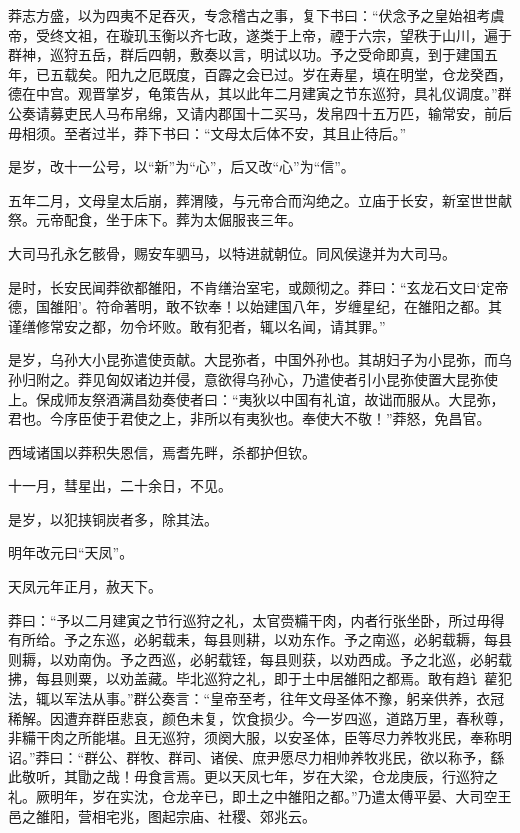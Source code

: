 \documentclass[]{article}
\begin{document}
莽志方盛，以为四夷不足吞灭，专念稽古之事，复下书曰：``伏念予之皇始祖考虞帝，受终文祖，在璇玑玉衡以齐七政，遂类于上帝，禋于六宗，望秩于山川，遍于群神，巡狩五岳，群后四朝，敷奏以言，明试以功。予之受命即真，到于建国五年，已五载矣。阳九之厄既度，百霹之会已过。岁在寿星，填在明堂，仓龙癸酉，德在中宫。观晋掌岁，龟策告从，其以此年二月建寅之节东巡狩，具礼仪调度。''群公奏请募吏民人马布帛绵，又请内郡国十二买马，发帛四十五万匹，输常安，前后毋相须。至者过半，莽下书曰：``文母太后体不安，其且止待后。''

是岁，改十一公号，以``新''为``心''，后又改``心''为``信''。

五年二月，文母皇太后崩，葬渭陵，与元帝合而沟绝之。立庙于长安，新室世世献祭。元帝配食，坐于床下。葬为太倔服丧三年。

大司马孔永乞骸骨，赐安车驷马，以特进就朝位。同风侯逯并为大司马。

是时，长安民闻莽欲都雒阳，不肯缮治室宅，或颇彻之。莽曰：``玄龙石文曰`定帝德，国雒阳'。符命著明，敢不钦奉！以始建国八年，岁缠星纪，在雒阳之都。其谨缮修常安之都，勿令坏败。敢有犯者，辄以名闻，请其罪。''

是岁，乌孙大小昆弥遣使贡献。大昆弥者，中国外孙也。其胡妇子为小昆弥，而乌孙归附之。莽见匈奴诸边并侵，意欲得乌孙心，乃遣使者引小昆弥使置大昆弥使上。保成师友祭酒满昌劾奏使者曰：``夷狄以中国有礼谊，故诎而服从。大昆弥，君也。今序臣使于君使之上，非所以有夷狄也。奉使大不敬！''莽怒，免昌官。

西域诸国以莽积失恩信，焉耆先畔，杀都护但钦。

十一月，彗星出，二十余日，不见。

是岁，以犯挟铜炭者多，除其法。

明年改元曰``天凤''。

天凤元年正月，赦天下。

莽曰：``予以二月建寅之节行巡狩之礼，太官赍糒干肉，内者行张坐卧，所过毋得有所给。予之东巡，必躬载耒，每县则耕，以劝东作。予之南巡，必躬载耨，每县则耨，以劝南伪。予之西巡，必躬载铚，每县则获，以劝西成。予之北巡，必躬载拂，每县则粟，以劝盖藏。毕北巡狩之礼，即于土中居雒阳之都焉。敢有趋讠雚犯法，辄以军法从事。''群公奏言：``皇帝至考，往年文母圣体不豫，躬亲供养，衣冠稀解。因遭弃群臣悲哀，颜色未复，饮食损少。今一岁四巡，道路万里，春秋尊，非糒干肉之所能堪。且无巡狩，须阕大服，以安圣体，臣等尽力养牧兆民，奉称明诏。''莽曰：``群公、群牧、群司、诸侯、庶尹愿尽力相帅养牧兆民，欲以称予，繇此敬听，其勖之哉！毋食言焉。更以天凤七年，岁在大梁，仓龙庚辰，行巡狩之礼。厥明年，岁在实沈，仓龙辛已，即土之中雒阳之都。''乃遣太傅平晏、大司空王邑之雒阳，营相宅兆，图起宗庙、社稷、郊兆云。
\end{document}
